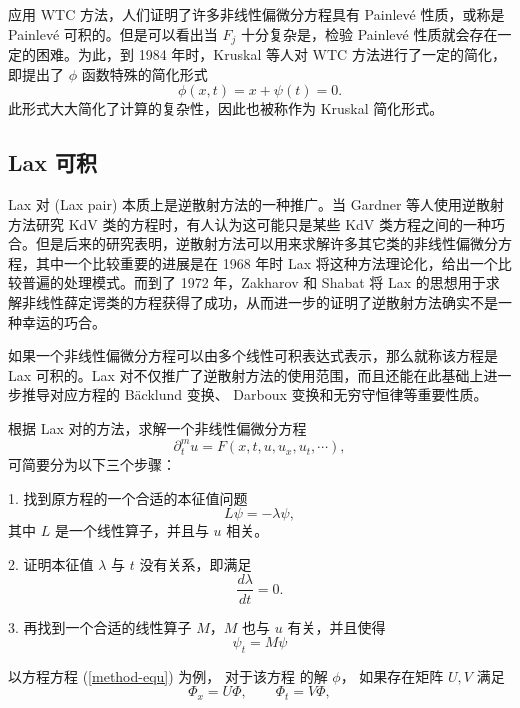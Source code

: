 应用 WTC 方法，人们证明了许多非线性偏微分方程具有 Painlev\'{e} 性质，或称是  Painlev\'{e} 可积的。但是可以看出当 $F_j$ 十分复杂是，检验 Painlev\'{e} 性质就会存在一定的困难。为此，到 1984 年时，Kruskal 等人对 WTC 方法进行了一定的简化，即提出了 $\phi$ 函数特殊的简化形式
\begin{equation}
  \phi(x,t) = x + \psi(t) = 0.
\end{equation}
此形式大大简化了计算的复杂性，因此也被称作为 Kruskal 简化形式。

\subsection{Lax 可积}
Lax 对 (Lax pair) 本质上是逆散射方法的一种推广。当 Gardner 等人使用逆散射方法研究 KdV 类的方程时，有人认为这可能只是某些 KdV 类方程之间的一种巧合。但是后来的研究表明，逆散射方法可以用来求解许多其它类的非线性偏微分方程，其中一个比较重要的进展是在 1968 年时 Lax 将这种方法理论化，给出一个比较普遍的处理模式。而到了 1972 年，Zakharov 和 Shabat 将 Lax 的思想用于求解非线性薛定谔类的方程获得了成功，从而进一步的证明了逆散射方法确实不是一种幸运的巧合。

如果一个非线性偏微分方程可以由多个线性可积表达式表示，那么就称该方程是 Lax 可积的。Lax 对不仅推广了逆散射方法的使用范围，而且还能在此基础上进一步推导对应方程的 B\"{a}cklund 变换、 Darboux 变换和无穷守恒律等重要性质。

根据 Lax 对的方法，求解一个非线性偏微分方程
\begin{equation}
  \partial^m_t u = F(x, t, u, u_x, u_t, \cdots),
\end{equation}
可简要分为以下三个步骤：

1. 找到原方程的一个合适的本征值问题
\begin{equation}
  L\psi = -\lambda \psi,
\end{equation}
其中 $L$ 是一个线性算子，并且与 $u$ 相关。

2. 证明本征值 $\lambda$ 与 $t$ 没有关系，即满足
\begin{equation}
  \frac{d\lambda}{dt} = 0.
\end{equation}

3. 再找到一个合适的线性算子 $M$，$M$ 也与 $u$ 有关，并且使得
\begin{equation}
  \psi_t = M\psi
\end{equation}

以方程方程 (\ref{method-equ}) 为例， 对于该方程 的解 $\phi$， 如果存在矩阵 $U, V$ 满足
\begin{equation}
  \Phi_x=U \Phi, \qquad \Phi_t=V \Phi, \label{method-Lax}
\end{equation}


